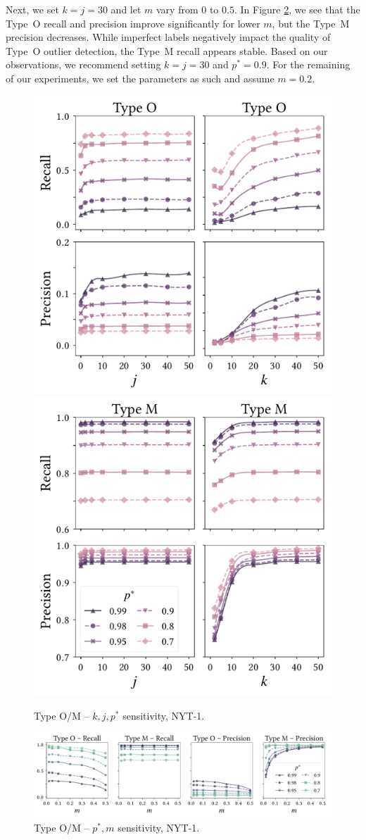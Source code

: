 Next, we set $k=j=30$ and let $m$ vary from $0$ to $0.5$. 
In Figure \ref{fig:typeAB_wrt_pc}, we see that the Type~O recall and precision improve significantly for lower $m$, but the Type~M precision decreases. 
While imperfect labels negatively impact the quality of Type~O outlier detection, the Type~M recall appears stable.  
Based on our observations, we recommend setting %
$k=j=30$ and $p^*=0.9$. For the remaining of our experiments, we set the parameters as such and assume $m=0.2$.

\begin{figure}[ht]
	\includegraphics[width=0.49\linewidth]{part4-figures/typeA_wrt_kjp_nyt_1-compressed.pdf}
	\includegraphics[width=0.49\linewidth]{part4-figures/typeB_wrt_kjp_nyt_1-compressed.pdf}
	\caption{Type O/M -- $k,j,p^*$ sensitivity, NYT-1.}
	\label{fig:typeAB_wrt_kjp}
\end{figure} 

\begin{figure}[ht]
	\includegraphics[width=\linewidth]{part4-figures/typeAB_wrt_pc-2-compressed.pdf}
	\caption{Type O/M -- $p^*,m$ sensitivity, NYT-1.}
	\label{fig:typeAB_wrt_pc}
\end{figure}

